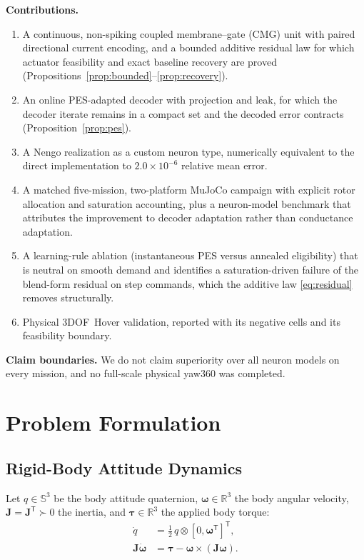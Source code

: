 \documentclass[letterpaper,10pt,conference]{IEEEtran}
\newcommand{\R}{\mathbb{R}}
\newcommand{\T}{^{\mathsf T}}
\begin{document}
\textbf{Contributions.}
\begin{enumerate}
\item A continuous, non-spiking coupled membrane--gate (CMG) unit with
paired directional current encoding, and a bounded additive residual law
for which actuator feasibility and exact baseline recovery are proved
(Propositions~\ref{prop:bounded}--\ref{prop:recovery}).
\item An online PES-adapted decoder with projection and leak, for which the
decoder iterate remains in a compact set and the decoded error contracts
(Proposition~\ref{prop:pes}).
\item A Nengo realization as a custom neuron type, numerically equivalent to
the direct implementation to $2.0\times10^{-6}$ relative mean error.
\item A matched five-mission, two-platform MuJoCo campaign with explicit
rotor allocation and saturation accounting, plus a neuron-model benchmark
that attributes the improvement to decoder adaptation rather than
conductance adaptation.
\item A learning-rule ablation (instantaneous PES versus annealed
eligibility) that is neutral on smooth demand and identifies a
saturation-driven failure of the blend-form residual on step commands,
which the additive law \eqref{eq:residual} removes structurally.
\item Physical 3DOF~Hover validation, reported with its negative cells and
its feasibility boundary.
\end{enumerate}

\textbf{Claim boundaries.} We do not claim superiority over all neuron
models on every mission, and no full-scale physical yaw360 was completed.

\section{Problem Formulation}
\label{sec:problem}

\subsection{Rigid-Body Attitude Dynamics}

Let $q\in\mathbb{S}^{3}$ be the body attitude quaternion, $\bm\omega\in\R^3$
the body angular velocity, $\bm J=\bm J\T\succ0$ the inertia, and
$\bm\tau\in\R^3$ the applied body torque:
\begin{align}
    \dot q &= \tfrac{1}{2}\,q\otimes[0,\bm\omega\T]\T,
    \label{eq:kin}\\
    \bm J\dot{\bm\omega} &= \bm\tau-\bm\omega\times(\bm J\bm\omega).
    \label{eq:dyn}
\end{align}
\end{document}
